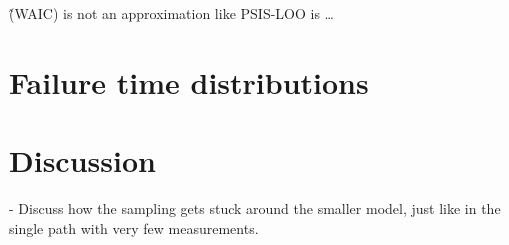 \^(WAIC) is not an approximation like PSIS-LOO is \ldots

\section{Failure time distributions}

\section{Discussion}

- Discuss how the sampling gets stuck around the smaller model, just like in the single path with very few measurements.